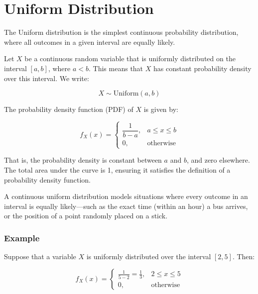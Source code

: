 \documentclass[twoside]{book}
\begin{document}

\section{Uniform Distribution}

The Uniform distribution is the simplest continuous probability distribution, where all outcomes in a given interval are equally likely.

Let $X$ be a continuous random variable that is uniformly distributed on the interval $[a, b]$, where $a < b$. This means that $X$ has constant probability density over this interval. We write:

\[
X \sim \text{Uniform}(a, b)
\]

The probability density function (PDF) of $X$ is given by:

\begin{textbox}
\[
f_X(x) =
\begin{cases}
\dfrac{1}{b - a}, & a \le x \le b \\
0, & \text{otherwise}
\end{cases}
\]
\end{textbox}

That is, the probability density is constant between $a$ and $b$, and zero elsewhere. The total area under the curve is 1, ensuring it satisfies the definition of a probability density function.

A continuous uniform distribution models situations where every outcome in an interval is equally likely—such as the exact time (within an hour) a bus arrives, or the position of a point randomly placed on a stick.


\subsubsection{Example}
Suppose that a variable $X$ is uniformly distributed over the interval $[2, 5]$. Then:

\[
f_X(x) =
\begin{cases}
\frac{1}{5 - 2} = \frac{1}{3}, & 2 \le x \le 5 \\
0, & \text{otherwise}
\end{cases}
\]
\end{document}
